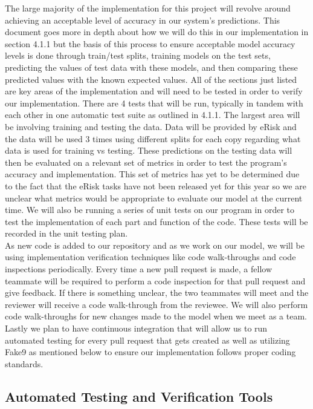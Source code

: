 \documentclass[12pt, titlepage]{article}
\begin{document}
  The large majority of the implementation for this project will revolve around achieving an acceptable level of accuracy in our system’s predictions. This document goes more in depth about how we will do this in our implementation in section 4.1.1 but the basis of this process to ensure acceptable model accuracy levels is done through train/test splits, training models on the test sets, predicting the values of test data with these models, and then comparing these predicted values with the known expected values. All of the sections just listed are key areas of the implementation and will need to be tested in order to verify our implementation. There are 4 tests that will be run, typically in tandem with each other in one automatic test suite as outlined in 4.1.1. The largest area will be involving training and testing the data. Data will be provided by eRisk and the data will be used 3 times using different splits for each copy regarding what data is used for training vs testing. These predictions on the testing data will then be evaluated on a relevant set of metrics in order to test the program's accuracy and implementation. This set of metrics has yet to be determined due to the fact that the eRisk tasks have not been released yet for this year so we are unclear what metrics would be appropriate to evaluate our model at the current time. We will also be running a series of unit tests on our program in order to test the implementation of each part and function of the code. These tests will be recorded in the unit testing plan.\\
    
  As new code is added to our repository and as we work on our model, we will be using implementation verification techniques like code walk-throughs and code inspections periodically. Every time a new pull request is made, a fellow teammate will be required to perform a code inspection for that pull request and give feedback. If there is something unclear, the two teammates will meet and the reviewer will receive a code walk-through from the reviewee. We will also perform code walk-throughs for new changes made to the model when we meet as a team. Lastly we plan to have continuous integration that will allow us to run automated testing for every pull request that gets created as well as utilizing Fake9 as mentioned below to ensure our implementation follows proper coding standards.
  
  
  \subsection{Automated Testing and Verification Tools} \label{Automated Testing and Verification Tools}
\end{document}
